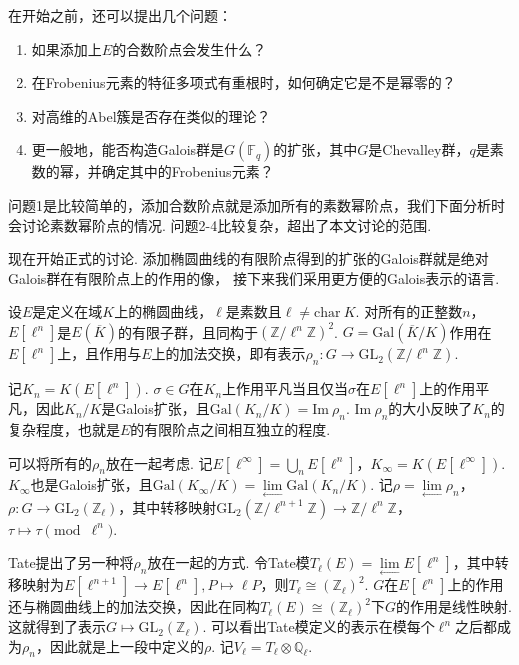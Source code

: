 在开始之前，还可以提出几个问题：
\begin{enumerate}
    \item 如果添加上$E$的合数阶点会发生什么？
    \item 在Frobenius元素的特征多项式有重根时，如何确定它是不是幂零的？
    \item 对高维的Abel簇是否存在类似的理论？
    \item 更一般地，能否构造Galois群是$G(\mathbb{F}_{q})$的扩张，其中$G$是Chevalley群，$q$是素数的幂，并确定其中的Frobenius元素？
\end{enumerate}

问题1是比较简单的，添加合数阶点就是添加所有的素数幂阶点，我们下面分析时会讨论素数幂阶点的情况.
问题2-4比较复杂，超出了本文讨论的范围.

\vskip0.3cm

现在开始正式的讨论.
添加椭圆曲线的有限阶点得到的扩张的Galois群就是绝对Galois群在有限阶点上的作用的像，
接下来我们采用更方便的Galois表示的语言.

设$E$是定义在域$K$上的椭圆曲线，$\ell$是素数且$\ell\neq \mathrm{char}\ K$. 对所有的正整数$n$，$E[\ell^n]$是$E(\overline{K})$的有限子群，且同构于$(\mathbb{Z}/\ell^n\mathbb{Z})^2$. $G = \mathrm{Gal}(\overline{K}/K)$作用在$E[\ell^n]$上，且作用与$E$上的加法交换，即有表示$\rho_n:G\to \mathrm{GL}_2(\mathbb{Z}/\ell^n \mathbb{Z})$.

记$K_n=K(E[\ell^n])$. $\sigma\in G$在$K_n$上作用平凡当且仅当$\sigma$在$E[\ell^n]$上的作用平凡，因此$K_n/K$是Galois扩张，且$\mathrm{Gal}(K_n/K)=\mathrm{Im}\ \rho_n$. $\mathrm{Im}\ \rho_n$的大小反映了$K_n$的复杂程度，也就是$E$的有限阶点之间相互独立的程度.

可以将所有的$\rho_n$放在一起考虑. 记$E[\ell^{\infty}]=\bigcup_n E[\ell^n]$，$K_{\infty} = K(E[\ell^{\infty}])$. $K_{\infty}$也是Galois扩张，且$\mathrm{Gal}(K_{\infty}/K) = \lim\limits_{\longleftarrow} \mathrm{Gal}(K_n/K)$. 记$\rho = \lim\limits_{\longleftarrow} \rho_n$，$\rho: G\to \mathrm{GL}_2(\mathbb{Z}_{\ell})$，其中转移映射$\mathrm{GL}_2(\mathbb{Z}/\ell^{n+1} \mathbb{Z}) \to \mathbb{Z}/\ell^n \mathbb{Z}$，$\tau \mapsto \tau \pmod{\ell^n}$.

Tate提出了另一种将$\rho_n$放在一起的方式. 令Tate模$T_{\ell}(E) = \lim\limits_{\longleftarrow} E[\ell^n]$，其中转移映射为$E[\ell^{n+1}]\to E[\ell^n], P\mapsto \ell P$，则$T_{\ell}\cong (\mathbb{Z}_{\ell})^2$. $G$在$E[\ell^n]$上的作用还与椭圆曲线上的加法交换，因此在同构$T_{\ell}(E)\cong (\mathbb{Z}_{\ell})^2$下$G$的作用是线性映射. 这就得到了表示$G\mapsto \mathrm{GL}_2(\mathbb{Z}_{\ell})$. 可以看出Tate模定义的表示在模每个$\ell^n$之后都成为$\rho_n$，因此就是上一段中定义的$\rho$.
记$V_{\ell} = T_{\ell}\otimes \mathbb{Q}_{\ell}$.

